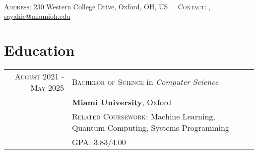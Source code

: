 \documentclass[letterpaper,8pt]{article} %
\begin{document}
\pagestyle{empty} %


\par
{\\
\footnotesize{
\textsc{Address:} 230 Western College Drive, Oxford, OH, US
·
\textsc{Contact:} \href{tel:+1-513-484-0972}{\color{black}{+1 (513) 484-0972}}, \href{mailto:sayahie@miamioh.edu}{\color{black}sayahie@miamioh.edu}\\
}\normalsize
\bigskip\par} %




\section{Education}

\footnotesize{\begin{tabular}{rl}	
\textsc{August 2021 - May 2025} & \textsc{Bachelor of Science} in \emph{Computer Science}\\ &
\textbf{Miami University}, Oxford\\ &
\footnotesize \textsc{Related Coursework:} Machine Learning, Quantum Computing, Systems Programming\\&
\footnotesize \textsc{GPA}: 3.83/4.00\normalsize \\


\end{tabular}}
\end{document}
